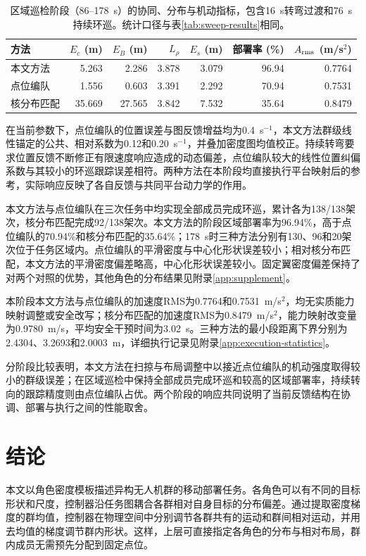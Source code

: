 \documentclass[UTF8,a4paper,11pt,fontset=none]{ctexart}
\begin{document}
\begin{table}[htbp]\centering\small
\caption{区域巡检阶段（86--178~s）的协同、分布与机动指标，包含16~s转弯过渡和76~s持续环巡。统计口径与表\ref{tab:sweep-results}相同。}\label{tab:patrol-results}
\setlength{\tabcolsep}{4pt}
\begin{tabular}{lrrrrrr}\toprule
方法 & $E_c$ (m) & $E_B$ (m) & $L_\rho$ & $E_s$ (m) & 部署率 (\%) & $A_{\rm rms}$ (m/s$^2$)\\\midrule
本文方法 & 5.263 & 2.286 & 3.878 & 3.079 & 96.94 & 0.7764\\
点位编队 & 1.556 & 0.603 & 3.391 & 2.292 & 70.94 & 0.7531\\
核分布匹配 & 35.669 & 27.565 & 3.842 & 7.532 & 35.64 & 0.8479\\\bottomrule
\end{tabular}\end{table}

在当前参数下，点位编队的位置误差与图反馈增益均为0.4~s$^{-1}$，本文方法群级线性锚定的公共、相对系数为0.12和0.20~s$^{-1}$，并叠加密度图均值校正。持续转弯要求位置反馈不断修正有限速度响应造成的动态偏差，点位编队较大的线性位置纠偏系数与其较小的环巡跟踪误差相符。两种方法在本阶段均直接执行平台映射后的参考，实际响应反映了各自反馈与共同平台动力学的作用。

本文方法与点位编队在三次任务中均实现全部成员完成环巡，累计各为138/138架次，核分布匹配完成92/138架次。本文方法的阶段区域部署率为96.94\%，高于点位编队的70.94\%和核分布匹配的35.64\%；178~s时三种方法分别有130、96和20架次位于任务区域内。点位编队的平滑密度与中心化形状误差较小；相对核分布匹配，本文方法的平滑密度偏差略高，中心化形状误差较小。固定翼密度偏差保持了对两个对照的优势，其他角色的分布结果见附录\ref{app:supplement}。

本阶段本文方法与点位编队的加速度RMS为0.7764和0.7531~m/s$^2$，均无实质能力映射调整或安全改写；核分布匹配的加速度RMS为0.8479~m/s$^2$，能力映射改变量为0.9780~m/s，平均安全干预时间为3.02~s。三种方法的最小段距离下界分别为2.4304、3.2693和2.0003~m，详细执行记录见附录\ref{app:execution-statistics}。
\FloatBarrier

分阶段比较表明，本文方法在扫掠与布局调整中以接近点位编队的机动强度取得较小的群级误差；在区域巡检中保持全部成员完成环巡和较高的区域部署率，持续转向的跟踪精度则由点位编队占优。两个阶段的响应共同说明了当前反馈结构在协调、部署与执行之间的性能取舍。

\section{结论}
本文以角色密度模板描述异构无人机群的移动部署任务。各角色可以有不同的目标形状和尺度，控制器沿任务图耦合各群相对自身目标的分布偏差。通过提取密度梯度的群均值，控制器在物理空间中分别调节各群共有的运动和群间相对运动，并用去均值的梯度调节群内形状。这样，上层可直接指定各角色的分布与相对布局，群内成员无需预先分配到固定点位。
\end{document}
